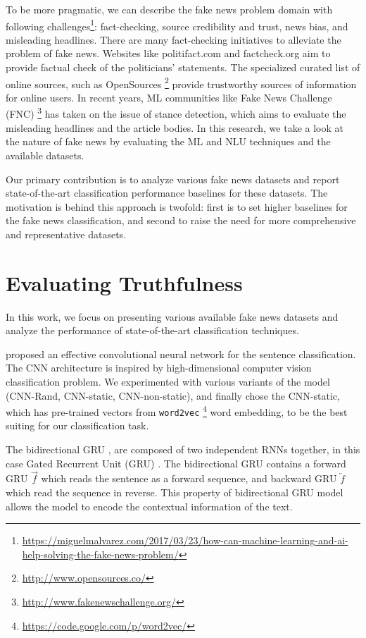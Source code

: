 To be more pragmatic, we can describe the fake news problem domain with following challenges\footnote{\url{https://miguelmalvarez.com/2017/03/23/how-can-machine-learning-and-ai-help-solving-the-fake-news-problem/}}: fact-checking, source credibility and trust, news bias, and misleading headlines. There are many fact-checking initiatives to alleviate the problem of fake news. Websites like politifact.com and factcheck.org aim to provide factual check of the politicians' statements. The specialized curated list of online sources, such as OpenSources \footnote{\url{http://www.opensources.co/}} provide trustworthy sources of information for online users.  In recent years,  ML communities like Fake News Challenge (FNC) \footnote{\url{http://www.fakenewschallenge.org/}} has taken on the issue of stance detection, which aims to evaluate the misleading headlines and the article bodies. In this research, we take a look at the nature of fake news by evaluating the ML and NLU techniques and the available datasets.

Our primary contribution is to analyze various fake news datasets and report state-of-the-art classification performance baselines for these datasets. The motivation is behind this approach is twofold: first is to set higher baselines for the fake news classification, and second to raise the need for more comprehensive and representative datasets.  


\section{Evaluating Truthfulness}
In this work, we focus on presenting various available fake news datasets and analyze the performance of state-of-the-art classification techniques.   

\citet{Kim14convolutionalneural} proposed an effective convolutional neural network for the sentence classification. The CNN architecture is inspired by high-dimensional computer vision classification problem. We experimented with various variants of the model (CNN-Rand, CNN-static, CNN-non-static), and finally chose the CNN-static, which has pre-trained vectors from \texttt{word2vec} \footnote{\url{https://code.google.com/p/word2vec/}} word embedding, to be the best suiting for our classification task.

The bidirectional GRU \cite{DBLP:journals/corr/BahdanauCB14},  are composed of two independent RNNs together, in this case Gated Recurrent Unit (GRU) \cite{ChoMGBSB14}. The bidirectional GRU contains a forward GRU $\overrightarrow{f} $ which reads the sentence as a forward sequence, and backward GRU $\overleftarrow{f}$ which read the sequence in reverse. This property of bidirectional GRU model allows the model to encode the contextual information of the text.

